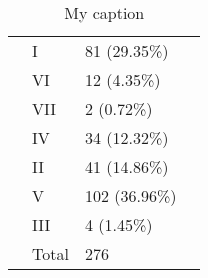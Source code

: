 \begin{table}[]
\begin{tabular}{|l|l|l|l}
 & I & 81 (29.35\%) &  \\ \cline{2-3}
 & VI & 12 (4.35\%) &  \\ \cline{2-3}
 & VII & 2 (0.72\%) &  \\ \cline{2-3}
 & IV & 34 (12.32\%) &  \\ \cline{2-3}
 & II & 41 (14.86\%) &  \\ \cline{2-3}
 & V & 102 (36.96\%) &  \\ \cline{2-3}
 & III & 4 (1.45\%) &  \\ \cline{2-3}
 & Total & 276 &  \\ \cline{1-3}
\end{tabular}
\caption{My caption}
\label{my-label}
\end{table}

\newpage
